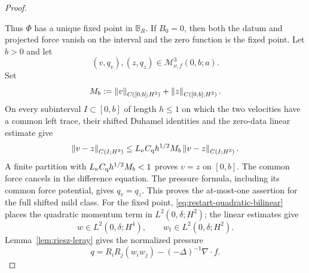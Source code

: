 \begin{proof}
\begin{samepage}
\end{samepage}
Thus \(\Phi\) has a unique fixed point in \(\mathbb B_R\).  If \(B_0=0\),
then both the datum and projected force vanish on the interval and the zero
function is the fixed point.  Let \(b>0\) and let
\[
 (v,q_v),(z,q_z)\in\mathscr M_{\nu,f}^3(0,b;a).
\]
Set
\[
 M_b:=\left\lVert v\right\rVert_{C([0,b];H^3)}+\left\lVert z\right\rVert_{C([0,b];H^3)}.
\]
On every subinterval \(I\subset[0,b]\) of length \(h\le1\) on which the two
velocities have a common left trace, their shifted Duhamel identities and the
zero-data linear estimate give
\[
 \left\lVert v-z\right\rVert_{C(I;H^3)}
 \le L_\nu C_{\rm q}h^{1/2}M_b
 \left\lVert v-z\right\rVert_{C(I;H^3)}.
\]
A finite partition with
\(L_\nu C_{\rm q}h^{1/2}M_b<1\) proves \(v=z\) on \([0,b]\).
The common force cancels in the difference equation.  The pressure formula,
including its common force potential, gives \(q_v=q_z\).  This proves the at-most-one
assertion for the full shifted mild class.  For the fixed point,
\eqref{eq:restart-quadratic-bilinear} places the quadratic momentum term in
\(L^2(0,\delta;H^2)\); the linear estimates give
\[
 w\in L^2(0,\delta;H^4),
 \qquad
 w_t\in L^2(0,\delta;H^2).
\]
Lemma~\ref{lem:riesz-leray} gives the normalized pressure
\[
 q=R_iR_j(w_iw_j)-(-\Delta)^{-1}\nabla\cdot f.
\]


\end{proof}
